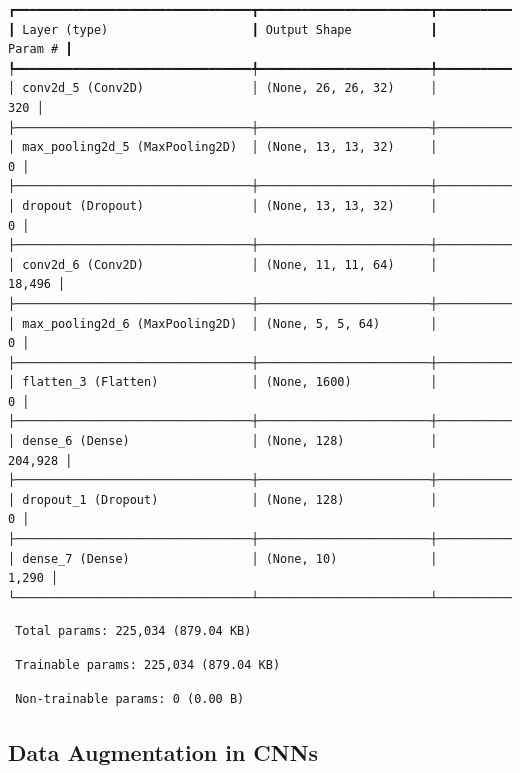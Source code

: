 \documentclass[
  letterpaper,
  DIV=11,
  numbers=noendperiod]{scrreprt}
\begin{document}
\begin{verbatim}
┏━━━━━━━━━━━━━━━━━━━━━━━━━━━━━━━━━┳━━━━━━━━━━━━━━━━━━━━━━━━┳━━━━━━━━━━━━━━━┓
┃ Layer (type)                    ┃ Output Shape           ┃       Param # ┃
┡━━━━━━━━━━━━━━━━━━━━━━━━━━━━━━━━━╇━━━━━━━━━━━━━━━━━━━━━━━━╇━━━━━━━━━━━━━━━┩
│ conv2d_5 (Conv2D)               │ (None, 26, 26, 32)     │           320 │
├─────────────────────────────────┼────────────────────────┼───────────────┤
│ max_pooling2d_5 (MaxPooling2D)  │ (None, 13, 13, 32)     │             0 │
├─────────────────────────────────┼────────────────────────┼───────────────┤
│ dropout (Dropout)               │ (None, 13, 13, 32)     │             0 │
├─────────────────────────────────┼────────────────────────┼───────────────┤
│ conv2d_6 (Conv2D)               │ (None, 11, 11, 64)     │        18,496 │
├─────────────────────────────────┼────────────────────────┼───────────────┤
│ max_pooling2d_6 (MaxPooling2D)  │ (None, 5, 5, 64)       │             0 │
├─────────────────────────────────┼────────────────────────┼───────────────┤
│ flatten_3 (Flatten)             │ (None, 1600)           │             0 │
├─────────────────────────────────┼────────────────────────┼───────────────┤
│ dense_6 (Dense)                 │ (None, 128)            │       204,928 │
├─────────────────────────────────┼────────────────────────┼───────────────┤
│ dropout_1 (Dropout)             │ (None, 128)            │             0 │
├─────────────────────────────────┼────────────────────────┼───────────────┤
│ dense_7 (Dense)                 │ (None, 10)             │         1,290 │
└─────────────────────────────────┴────────────────────────┴───────────────┘
\end{verbatim}

\begin{verbatim}
 Total params: 225,034 (879.04 KB)
\end{verbatim}

\begin{verbatim}
 Trainable params: 225,034 (879.04 KB)
\end{verbatim}

\begin{verbatim}
 Non-trainable params: 0 (0.00 B)
\end{verbatim}

\subsection{Data Augmentation in CNNs}\label{data-augmentation-in-cnns}
\end{document}
